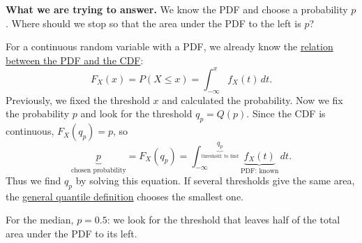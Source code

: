\documentclass[a4paper,12pt,oneside]{report}
\begin{document}
\begin{notebox}
\label{note:quantile-pdf-area}
\textbf{What we are trying to answer.}
We know the PDF and choose a probability $p$. Where should we stop
so that the area under the PDF to the left is $p$?

For a continuous random variable with a PDF, we already know the
\hyperref[rel:pdf-to-cdf]{relation between the PDF and the CDF}:
\[
  F_X(x)=P(X\leq x)=\int_{-\infty}^{x}f_X(t)\,dt.
\]
Previously, we fixed the threshold $x$ and calculated the probability.
Now we fix the probability $p$ and look for the threshold $q_p=Q(p)$.
Since the CDF is continuous, $F_X(q_p)=p$, so
\[
  \underbrace{p}_{\text{chosen probability}}
  =F_X(q_p)
  =\int_{-\infty}^{\underbrace{q_p}_{\text{threshold: to find}}}
    \underbrace{f_X(t)}_{\text{PDF: known}}\,dt.
\]
Thus we find $q_p$ by solving this equation. If several thresholds
give the same area, the
\hyperref[def:quantile-general]{general quantile definition}
chooses the smallest one.

For the median, $p=0.5$: we look for the threshold that leaves
half of the total area under the PDF to its left.
\end{notebox}
\end{document}
